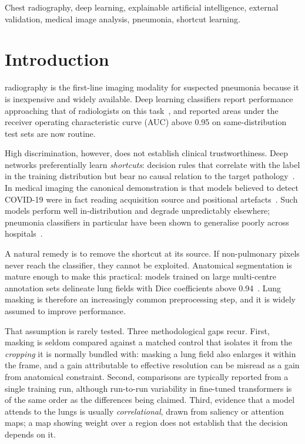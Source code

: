 \documentclass[journal,twoside,web]{ieeecolor}
\begin{document}
\begin{IEEEkeywords}
Chest radiography, deep learning, explainable artificial intelligence, external validation, medical image analysis, pneumonia, shortcut learning.
\end{IEEEkeywords}

\section{Introduction}
\label{sec:intro}

 radiography is the first-line imaging modality for suspected pneumonia because it is inexpensive and widely available. Deep learning classifiers report performance approaching that of radiologists on this task~\cite{rajpurkar2017}, and reported areas under the receiver operating characteristic curve (AUC) above 0.95 on same-distribution test sets are now routine.

High discrimination, however, does not establish clinical trustworthiness. Deep networks preferentially learn \emph{shortcuts}: decision rules that correlate with the label in the training distribution but bear no causal relation to the target pathology~\cite{geirhos2020}. In medical imaging the canonical demonstration is that models believed to detect COVID-19 were in fact reading acquisition source and positional artefacts~\cite{degrave2021}. Such models perform well in-distribution and degrade unpredictably elsewhere; pneumonia classifiers in particular have been shown to generalise poorly across hospitals~\cite{zech2018}.

A natural remedy is to remove the shortcut at its source. If non-pulmonary pixels never reach the classifier, they cannot be exploited. Anatomical segmentation is mature enough to make this practical: models trained on large multi-centre annotation sets delineate lung fields with Dice coefficients above 0.94~\cite{gaggion2024}. Lung masking is therefore an increasingly common preprocessing step, and it is widely assumed to improve performance.

That assumption is rarely tested. Three methodological gaps recur. First, masking is seldom compared against a matched control that isolates it from the \emph{cropping} it is normally bundled with: masking a lung field also enlarges it within the frame, and a gain attributable to effective resolution can be misread as a gain from anatomical constraint. Second, comparisons are typically reported from a single training run, although run-to-run variability in fine-tuned transformers is of the same order as the differences being claimed. Third, evidence that a model attends to the lungs is usually \emph{correlational}, drawn from saliency or attention maps; a map showing weight over a region does not establish that the decision depends on it.
\end{document}
